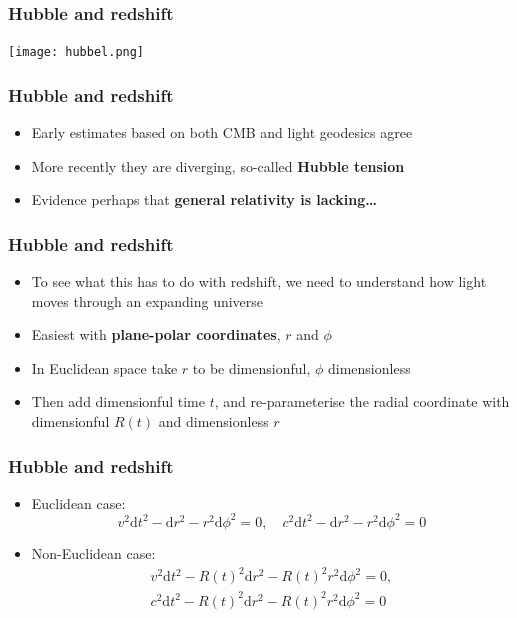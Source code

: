 \documentclass{beamer}
\begin{document}
\begin{frame}
  \frametitle{Hubble and redshift}
  \center
  \texttt{[image: hubbel.png]}
\end{frame}

\begin{frame}
  \frametitle{Hubble and redshift}
  \begin{itemize}
    \item Early estimates based on both CMB and light geodesics agree
    \item More recently they are diverging, so-called \textbf{Hubble tension}
    \item Evidence perhaps that \textbf{general relativity is lacking\ldots}
  \end{itemize}
\end{frame}

\begin{frame}
  \frametitle{Hubble and redshift}
  \begin{itemize}
    \item To see what this has to do with redshift, we need to understand how light moves through an expanding universe
    \item Easiest with \textbf{plane-polar coordinates}, $r$ and $\phi$
    \item In Euclidean space take $r$ to be dimensionful, $\phi$ dimensionless
    \item Then add dimensionful time $t$, and re-parameterise the radial coordinate with dimensionful $R(t)$ and dimensionless $r$
  \end{itemize}
\end{frame}

\begin{frame}
  \frametitle{Hubble and redshift}
  \begin{itemize}
    \item Euclidean case:
      \begin{equation*}
	v^2\mathrm{d}t^2-\mathrm{d}r^2-r^2\mathrm{d}\phi^2=0,\quad c^2\mathrm{d}t^2-\mathrm{d}r^2-r^2\mathrm{d}\phi^2=0
      \end{equation*}
    \item Non-Euclidean case:
      \begin{gather*}
	v^2\mathrm{d}t^2-R(t)^2\mathrm{d}r^2-R(t)^2r^2\mathrm{d}\phi^2=0,\\
	c^2\mathrm{d}t^2-R(t)^2\mathrm{d}r^2-R(t)^2r^2\mathrm{d}\phi^2=0
      \end{gather*}
  \end{itemize}
\end{frame}
\end{document}
